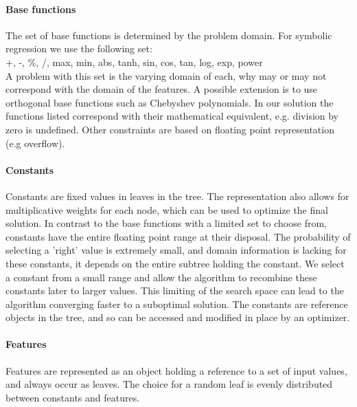 \paragraph{Base functions}
The set of base functions is determined by the problem domain. For symbolic regression we use the following set:\\
+, -, \%, /, max, min, abs, tanh, sin, cos, tan, log, exp, power\\
A problem with this set is the varying domain of each, why may or may not correspond with the domain of the features. A possible extension is to use orthogonal base functions such as Chebyshev polynomials. In our solution the functions listed correspond with their mathematical equivalent, e.g. division by zero is undefined. Other constraints are based on floating point representation (e.g overflow).

\paragraph{Constants}
Constants are fixed values in leaves in the tree. The representation also allows for multiplicative weights for each node, which can be used to optimize the final solution. In contrast to the base functions with a limited set to choose from, constants have the entire floating point range at their disposal. The probability of selecting a 'right' value is extremely small, and domain information is lacking for these constants, it depends on the entire subtree holding the constant. We select a constant from a small range and allow the algorithm to recombine these constants later to larger values. This limiting of the search space can lead to the algorithm converging faster to a suboptimal solution.
The constants are reference objects in the tree, and so can be accessed and modified in place by an optimizer.

\paragraph{Features}
Features are represented as an object holding a reference to a set of input values, and always occur as leaves. The choice for a random leaf is evenly distributed between constants and features.

